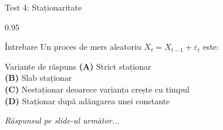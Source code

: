 \documentclass[9pt, aspectratio=169, t]{beamer}
\begin{document}
\begin{frame}{Test 4: Staționaritate}
    \begin{cminipage}{0.95\textwidth}
    \begin{alertblock}{Întrebare}
        Un proces de mers aleatoriu $X_t = X_{t-1} + \varepsilon_t$ este:
    \end{alertblock}

    \vspace{0.4cm}

    \begin{block}{Variante de răspuns}
    \textcolor{MainBlue}{\textbf{(A)}} Strict staționar\\[3pt]
    \textcolor{MainBlue}{\textbf{(B)}} Slab staționar\\[3pt]
    \textcolor{MainBlue}{\textbf{(C)}} Nestaționar deoarece varianța crește cu timpul\\[3pt]
    \textcolor{MainBlue}{\textbf{(D)}} Staționar după adăugarea unei constante
    \end{block}
    \vspace{0.5cm}

    \begin{center}
        \textit{Răspunsul pe slide-ul următor...}
    \end{center}
    \end{cminipage}
\end{frame}
\end{document}
